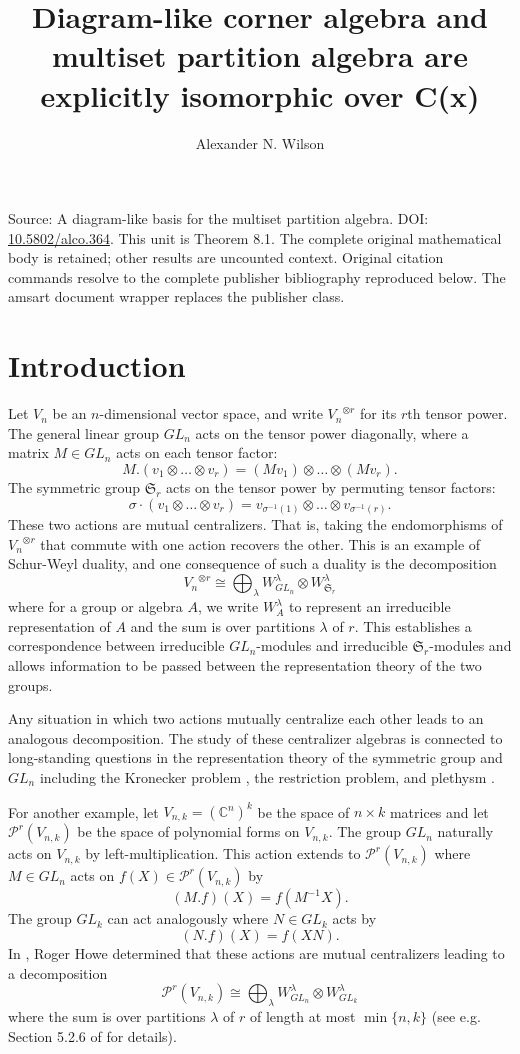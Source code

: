 \documentclass[10pt]{amsart}
\title[Human proof corpus 993]{Diagram-like corner algebra and multiset partition algebra are explicitly isomorphic over C(x)}
\author{Alexander N. Wilson}
\theoremstyle{definition}
\theoremstyle{definition}
\theoremstyle{plain}
\theoremstyle{remark}
\theoremstyle{plain}
\theoremstyle{plain}
\newcommand{\C}{\mathbb{C}}
\newcommand{\PP}{\mathcal{P}}
\newcommand{\SG}{\mathfrak{S}}
\begin{document}
\maketitle
\noindent Source: A diagram-like basis for the multiset partition algebra. DOI: \href{https://doi.org/10.5802/alco.364}{10.5802/alco.364}. This unit is Theorem 8.1. The complete original mathematical body is retained; other results are uncounted context. Original citation commands resolve to the complete publisher bibliography reproduced below. The amsart document wrapper replaces the publisher class.



\section{Introduction}

Let $V_n$ be an $n$-dimensional vector space, and write ${V_n}^{\otimes r}$ for its $r$th tensor power. The general linear group $GL_n$ acts on the tensor power diagonally, where a matrix $M\in GL_n$ acts on each tensor factor: \[M.(v_1\otimes\dots\otimes v_r)=(Mv_1)\otimes\dots\otimes (Mv_r).\] The symmetric group $\SG_r$ acts on the tensor power by permuting tensor factors: \[\sigma\cdot(v_1\otimes\dots\otimes v_r)=v_{\sigma^{-1}(1)}\otimes\dots\otimes v_{\sigma^{-1}(r)}.\] These two actions are mutual centralizers. That is, taking the endomorphisms of ${V_n}^{\otimes r}$ that commute with one action recovers the other. This is an example of Schur-Weyl duality, and one consequence of such a duality is the decomposition \[{V_n}^{\otimes r}\cong\bigoplus_{\lambda}W_{GL_n}^\lambda\otimes W_{\SG_r}^\lambda\] where for a group or algebra $A$, we write $W_A^\lambda$ to represent an irreducible representation of $A$ and the sum is over partitions $\lambda$ of $r$. This establishes a correspondence between irreducible $GL_n$-modules and irreducible $\SG_r$-modules and allows information to be passed between the representation theory of the two groups.

Any situation in which two actions mutually centralize each other leads to an analogous decomposition. The study of these centralizer algebras is connected to long-standing questions in the representation theory of the symmetric group and $GL_n$ including the Kronecker problem \cite{bowman2015partition,orellana2020howe}, the restriction problem, and plethysm \cite{orellana2021uniform}.

For another example, let $V_{n,k}=(\C^n)^k$ be the space of $n\times k$ matrices and let $\PP^r(V_{n,k})$ be the space of polynomial forms on $V_{n,k}$. The group $GL_n$ naturally acts on $V_{n,k}$ by left-multiplication. This action extends to $\PP^r(V_{n,k})$ where $M\in GL_n$ acts on $f(X)\in\PP^r(V_{n,k})$ by \[(M.f)(X)=f(M^{-1}X).\] The group $GL_k$ can act analogously where $N\in GL_k$ acts by \[(N.f)(X)=f(XN).\] In \cite{howe}, Roger Howe determined that these actions are mutual centralizers leading to a decomposition \[\PP^r(V_{n,k})\cong\bigoplus_{\lambda} W_{GL_n}^\lambda\otimes W_{GL_k}^\lambda\] where the sum is over partitions $\lambda$ of $r$ of length at most $\min\{n,k\}$ (see e.g. Section 5.2.6 of \cite{gw} for details).
\end{document}
